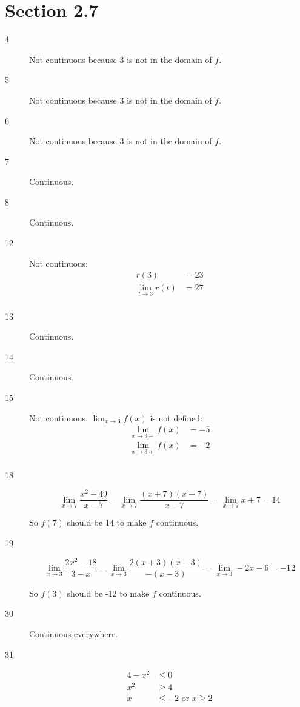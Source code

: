 \documentclass{exam}
\begin{document}
\section{Section 2.7}
\begin{description}
\item[4]
Not continuous because 3 is not in the domain of $f$.

\item[5]
Not continuous because 3 is not in the domain of $f$.

\item[6]
Not continuous because 3 is not in the domain of $f$.

\item[7]
Continuous.

\item[8]
Continuous.

\item[12]
Not continuous:
\begin{align*}
  r(3) &= 23 \\
  \lim_{t \to 3} r(t) &= 27 \\
\end{align*}

\item[13]
Continuous.

\item[14]
Continuous.

\item[15]
Not continuous.  $\lim_{x \to 3} f(x)$ is not defined:
\begin{align*}
  \lim_{x \to 3-} f(x) &= -5 \\
  \lim_{x \to 3+} f(x) &= -2 \\
\end{align*}

\item[18]
\[
  \lim_{x \to 7} \frac{x^2 - 49}{x-7} = \lim_{x \to 7} \frac{(x+7)(x-7)}{x-7} = \lim_{x \to 7} x+7 = 14
\]

So $f(7)$ should be 14 to make $f$ continuous.

\item[19]
\[
  \lim_{x \to 3} \frac{2x^2 - 18}{3-x} = \lim_{x \to 3} \frac{2(x+3)(x-3)}{-(x-3)} = \lim_{x \to 3} -2x - 6 = -12
\]

So $f(3)$ should be -12 to make $f$ continuous.

\item[30]
Continuous everywhere.

\item[31]
\begin{align*}
  4 - x^2 &\leq 0 \\
  x^2 &\geq 4 \\
  x &\leq -2 \text{ or } x \geq 2 \\
\end{align*}


\end{description}
\end{document}
